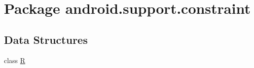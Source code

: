 \hypertarget{namespaceandroid_1_1support_1_1constraint}{}\section{Package android.\+support.\+constraint}
\label{namespaceandroid_1_1support_1_1constraint}
\subsection*{Data Structures}
\begin{DoxyCompactItemize}
\item 
class \mbox{\hyperlink{classandroid_1_1support_1_1constraint_1_1_r}{R}}
\end{DoxyCompactItemize}

